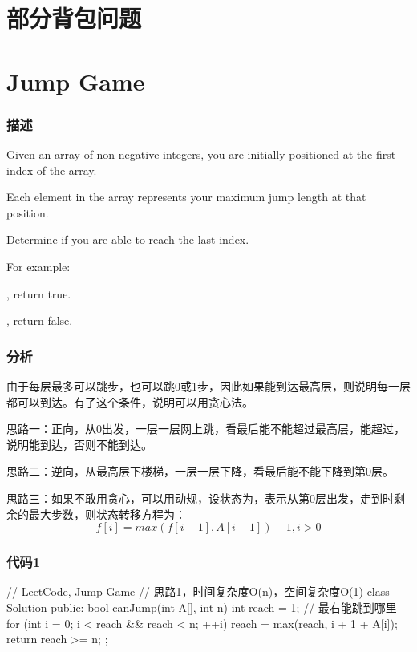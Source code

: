 \section{部分背包问题} %


\section{Jump Game} %
\label{sec:jump-game}


\subsubsection{描述}
Given an array of non-negative integers, you are initially positioned at the first index of the array.

Each element in the array represents your maximum jump length at that position.

Determine if you are able to reach the last index.

For example:

, return true.

, return false.


\subsubsection{分析}
由于每层最多可以跳步，也可以跳0或1步，因此如果能到达最高层，则说明每一层都可以到达。有了这个条件，说明可以用贪心法。

思路一：正向，从0出发，一层一层网上跳，看最后能不能超过最高层，能超过，说明能到达，否则不能到达。

思路二：逆向，从最高层下楼梯，一层一层下降，看最后能不能下降到第0层。

思路三：如果不敢用贪心，可以用动规，设状态为，表示从第0层出发，走到时剩余的最大步数，则状态转移方程为：
$$
f[i] = max(f[i-1], A[i-1])-1, i > 0
$$


\subsubsection{代码1}
\begin{Code}
	// LeetCode, Jump Game
	// 思路1，时间复杂度O(n)，空间复杂度O(1)
	class Solution {
		public:
		bool canJump(int A[], int n) {
			int reach = 1; // 最右能跳到哪里
			for (int i = 0; i < reach && reach < n; ++i)
			reach = max(reach,  i + 1 + A[i]);
			return reach >= n;
		}
	};
\end{Code}


